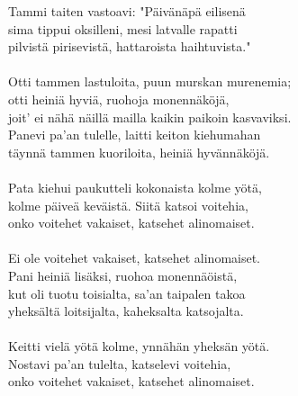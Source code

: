 Tammi taiten vastoavi: "Päivänäpä eilisenä                             \\
sima tippui oksilleni, mesi latvalle rapatti                           \\
pilvistä pirisevistä, hattaroista haihtuvista."                        \\
                                                                       \\
Otti tammen lastuloita, puun murskan murenemia;                        \\
otti heiniä hyviä, ruohoja monennäköjä,                                \\
joit' ei nähä näillä mailla kaikin paikoin kasvaviksi.                 \\
Panevi pa'an tulelle, laitti keiton kiehumahan                         \\
täynnä tammen kuoriloita, heiniä hyvännäköjä.                          \\
                                                                       \\
Pata kiehui paukutteli kokonaista kolme yötä,                          \\
kolme päiveä keväistä. Siitä katsoi voitehia,                          \\
onko voitehet vakaiset, katsehet alinomaiset.                          \\
                                                                       \\
Ei ole voitehet vakaiset, katsehet alinomaiset.                        \\
Pani heiniä lisäksi, ruohoa monennäöistä,                              \\
kut oli tuotu toisialta, sa'an taipalen takoa                          \\
yheksältä loitsijalta, kaheksalta katsojalta.                          \\
                                                                       \\
Keitti vielä yötä kolme, ynnähän yheksän yötä.                         \\
Nostavi pa'an tulelta, katselevi voitehia,                             \\
onko voitehet vakaiset, katsehet alinomaiset.                          \\
                                                                       \\
